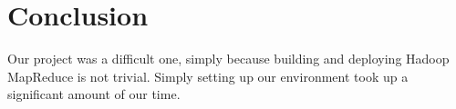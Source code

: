 \section{Conclusion}
\label{section:conclusion}
Our project was a difficult one, simply because building and deploying 
Hadoop MapReduce is not trivial. Simply setting up our environment 
took up a significant amount of our time. 